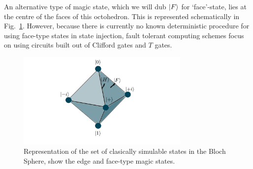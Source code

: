 \documentclass{standalone}
\begin{document}
\par
An alternative type of magic state, which we will dub $\ket{F}$ for `face'-state, lies at the centre of the faces of this octohedron. This is represented schematically in Fig.~\ref{fig:octohedron}. However, because there is currently no known deterministic procedure for using face-type states in state injection, fault tolerant computing schemes focus on using circuits built out of Clifford gates and $T$ gates.
\par
\begin{figure}
    \centering
    \includegraphics[width=0.75\textwidth]{Figures/octohedron.pdf}
\caption{Representation of the set of clasically simulable states in the Bloch Sphere, show the edge and face-type magic states.}
\label{fig:octohedron}
\end{figure}
\end{document}
